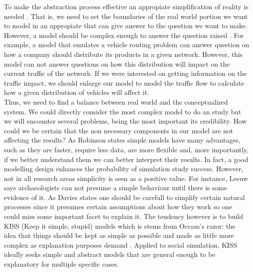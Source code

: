 \documentclass{report}
\begin{document}
To make the abstraction process effective an appropiate simplification of reality is needed \cite{Pidd2003}. That is, we need to set the 
boundaries of the real world portion we want to model in an appropiate that can give answer to the question we want to make. 
However, a model should be complex enough to answer the question raised \cite{Banks1998}. For example, a model that emulates a vehicle routing
problem can answer question on how a company should distribute its products in a given network. However, this model can not answer questions
on how this distribution will impact on the current traffic of the network. If we were interested on getting information on the traffic impact, we should enlarge our model to model the traffic flow to calculate how a given distribution of vehicles will affect it.  \\

Thus, we need to find a balance between real world and the conceptualized system. We could directly consider the most complex model to do an study but we will encounter several problems, being the most important its credibility. How could we be certain that the non necessary components in our model are not affecting the results? As Robinson \cite{Robinson2008} states simple models have many advantages, such as they are faster, require less data, are more flexible and, more importantly, if we better understand them we can better interpret their results.
In fact, a good modelling design enhances the probability of simulation study success. However, not in all research areas simplicity is seen as a positive value. For instance, Leeuw \cite{Leeuw2004} says archaeologists can not presume a simple behaviour until there is some evidence of it. As Davies \cite{Davies2003} states one should be carefull to simplify certain natural processes since it presumes certain assumptions about how they work so one could miss some important facet to explain it. The tendency however is to build KISS (Keep it simple, stupid) models which is stems from Occam’s razor: the idea that things should be kept as simple as possible and made as little more complex as explanation purposes demand \cite{Axelrod1997a}. Applied to social simulation, KISS ideally seeks simple and abstract models that are general enough to be explanatory for multiple specific cases.\\



\end{document}
